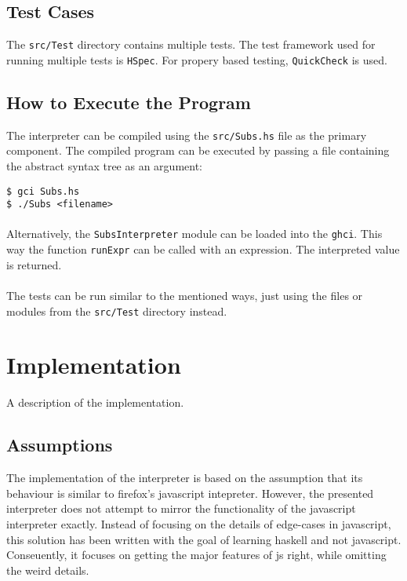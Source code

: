 \documentclass[11pt, a4paper]{article}
\begin{document}
\subsection{Test Cases}
The \texttt{src/Test} directory contains multiple tests. The test framework used for running multiple tests is \texttt{HSpec}. For propery based testing, \texttt{QuickCheck} is used.

\subsection{How to Execute the Program}
The interpreter can be compiled using the \texttt{src/Subs.hs} file as the primary component. The compiled program can be executed by passing a file containing the abstract syntax tree as an argument:
\begin{lstlisting}[style=Bash]
$ gci Subs.hs
$ ./Subs <filename>
\end{lstlisting}

\paragraph{}
Alternatively, the \texttt{SubsInterpreter} module can be loaded into the \texttt{ghci}. This way the function \texttt{runExpr} can be called with an expression. The interpreted value is returned.

\paragraph{}
The tests can be run similar to the mentioned ways, just using the files or modules from the \texttt{src/Test} directory instead.

\pagebreak
\section{Implementation}
A description of the implementation.

\subsection{Assumptions}
The implementation of the interpreter is based on the assumption that its behaviour is similar to firefox's javascript intepreter. However, the presented interpreter does not attempt to mirror the functionality of the javascript interpreter exactly. Instead of focusing on the details of edge-cases in javascript, this solution has been written with the goal of learning haskell and not javascript. Conseuently, it  focuses on getting the major features of js right, while omitting the weird details. 
\end{document}
